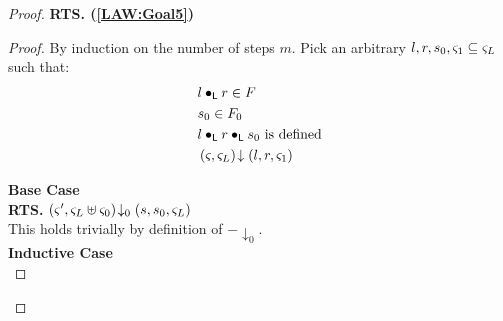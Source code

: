 \begin{lemma}[]
\begin{proof}
%
\noindent\textbf{RTS. (\ref{LAW:Goal5})}\\
\begin{proof}
By induction on the number of steps $m$. Pick an arbitrary $l, r, s_0, \varsigma_{1} \subseteq \varsigma_{L}$ such that:
%
\begin{align}
	&l \bullet_{\textsf{L}} r \in F \label{LAW2:Ass1}\\
	& s_0 \in F_0 \label{LAW2:Ass2}\\
	& l \bullet_{\textsf{L}} r \bullet_{\textsf{L}} s_0 \text{ is defined} \label{LAW2:Ass3} \\
	& \left(\varsigma_{}, \varsigma_{L}\right) \!\downarrow \left(l, r, \varsigma_{1}\right) \label{LAW2:Ass4}
\end{align}

\noindent\textbf{Base Case}\\
\textbf{RTS. } $\left(\varsigma_{}', \varsigma_{L} \uplus \varsigma_{0}\right) \!\downarrow_{0} \left(s, s_0, \varsigma_{L}\right)$\\
This holds trivially by definition of $-\downarrow_{0}$.\\

\noindent\textbf{Inductive Case}\\


\end{proof}
\end{proof}
\end{lemma}
